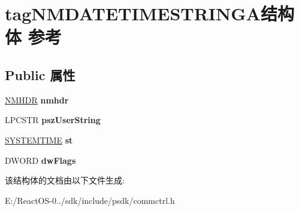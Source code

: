 \hypertarget{structtag_n_m_d_a_t_e_t_i_m_e_s_t_r_i_n_g_a}{}\section{tag\+N\+M\+D\+A\+T\+E\+T\+I\+M\+E\+S\+T\+R\+I\+N\+G\+A结构体 参考}
\label{structtag_n_m_d_a_t_e_t_i_m_e_s_t_r_i_n_g_a}
\subsection*{Public 属性}
\begin{DoxyCompactItemize}
\item 
\mbox{\label{structtag_n_m_d_a_t_e_t_i_m_e_s_t_r_i_n_g_a_a5ae3f0fe268587e0fff9a2f0375d65a6}} 
\hyperlink{structtag_n_m_h_d_r}{N\+M\+H\+DR} {\bfseries nmhdr}
\item 
\mbox{\label{structtag_n_m_d_a_t_e_t_i_m_e_s_t_r_i_n_g_a_ac6c5c02e498d65d2a7e6b88c46536a1a}} 
L\+P\+C\+S\+TR {\bfseries psz\+User\+String}
\item 
\mbox{\label{structtag_n_m_d_a_t_e_t_i_m_e_s_t_r_i_n_g_a_a3d5c28750a0382909d035ed57df66b7a}} 
\hyperlink{struct___s_y_s_t_e_m_t_i_m_e}{S\+Y\+S\+T\+E\+M\+T\+I\+ME} {\bfseries st}
\item 
\mbox{\label{structtag_n_m_d_a_t_e_t_i_m_e_s_t_r_i_n_g_a_a7b5ca553da31ceeac94dd6352da01d99}} 
D\+W\+O\+RD {\bfseries dw\+Flags}
\end{DoxyCompactItemize}


该结构体的文档由以下文件生成\+:\begin{DoxyCompactItemize}
\item 
E\+:/\+React\+O\+S-\/0../sdk/include/psdk/commctrl.\+h\end{DoxyCompactItemize}
